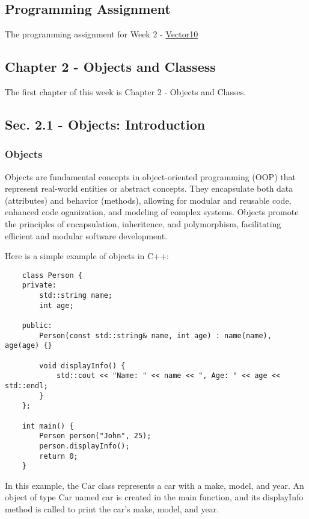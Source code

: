 \subsection{Programming Assignment}
The programming assignment for Week 2 - \href{https://github.com/cu-cspb-2270-Summer-2023/pa1-RelativiBit}{Vector10}

\subsection{Chapter 2 - Objects and Classess} 
The first chapter of this week is Chapter 2 - Objects and Classes.


\subsection*{Sec. 2.1 - Objects: Introduction}
\subsubsection*{Objects}

Objects are fundamental concepts in object-oriented programming (OOP) that represent real-world entities or abstract concepts. They encapsulate both data (attributes) and behavior (methods), allowing for modular and reusable
code, enhanced code oganization, and modeling of complex systems. Objects promote the principles of encapsulation, inheritence, and polymorphism, facilitating efficient and modular software development.

\begin{solution}
    Here is a simple example of objects in C++: \\
    \horizontalline
    \begin{verbatim}
    class Person {
    private:
        std::string name;
        int age;
    
    public:
        Person(const std::string& name, int age) : name(name), age(age) {}

        void displayInfo() {
            std::cout << "Name: " << name << ", Age: " << age << std::endl;
        }
    };

    int main() {
        Person person("John", 25);
        person.displayInfo();
        return 0;
    }
    \end{verbatim}
    
    \horizontalline
    
    In this example, the Car class represents a car with a make, model, and year. An object of type Car named car is created in the main function, and its displayInfo method is called to print the car's make, model, and year.
\end{solution}

